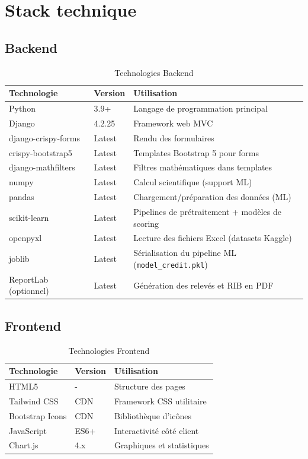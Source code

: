 \documentclass[12pt,a4paper]{report}
\begin{document}
\section{Stack technique}

\subsection{Backend}
\begin{table}[H]
\centering
\begin{tabular}{|p{4cm}|p{4cm}|p{6cm}|}
\hline
\rowcolor{banquiseblue!30}
\textbf{Technologie} & \textbf{Version} & \textbf{Utilisation} \\
\hline
Python & 3.9+ & Langage de programmation principal \\
\hline
Django & 4.2.25 & Framework web MVC \\
\hline
django-crispy-forms & Latest & Rendu des formulaires \\
\hline
crispy-bootstrap5 & Latest & Templates Bootstrap 5 pour forms \\
\hline
django-mathfilters & Latest & Filtres mathématiques dans templates \\
\hline
numpy & Latest & Calcul scientifique (support ML) \\
\hline
pandas & Latest & Chargement/préparation des données (ML) \\
\hline
scikit-learn & Latest & Pipelines de prétraitement + modèles de scoring \\
\hline
openpyxl & Latest & Lecture des fichiers Excel (datasets Kaggle) \\
\hline
joblib & Latest & Sérialisation du pipeline ML (\texttt{model\_credit.pkl}) \\
\hline
ReportLab (optionnel) & Latest & Génération des relevés et RIB en PDF \\
\hline
\end{tabular}
\caption{Technologies Backend}
\end{table}

\subsection{Frontend}
\begin{table}[H]
\centering
\begin{tabular}{|p{4cm}|p{4cm}|p{6cm}|}
\hline
\rowcolor{banquiseblue!30}
\textbf{Technologie} & \textbf{Version} & \textbf{Utilisation} \\
\hline
HTML5 & - & Structure des pages \\
\hline
Tailwind CSS & CDN & Framework CSS utilitaire \\
\hline
Bootstrap Icons & CDN & Bibliothèque d'icônes \\
\hline
JavaScript & ES6+ & Interactivité côté client \\
\hline
Chart.js & 4.x & Graphiques et statistiques \\
\hline
\end{tabular}
\caption{Technologies Frontend}
\end{table}
\end{document}
